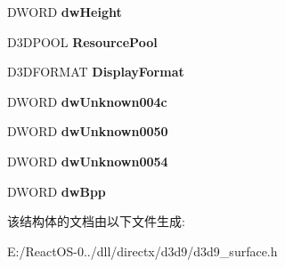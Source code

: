 \begin{DoxyCompactItemize}
\item 
\mbox{\label{struct___d3_d9_base_surface_a5f5f22c847022ad0ac8b59956f4b7405}} 
D\+W\+O\+RD {\bfseries dw\+Height}
\item 
\mbox{\label{struct___d3_d9_base_surface_a352fc832887945cb44c8cee2b141c6ea}} 
D3\+D\+P\+O\+OL {\bfseries Resource\+Pool}
\item 
\mbox{\label{struct___d3_d9_base_surface_a69b0a58f57ff9f5d595eb4be615f56b7}} 
D3\+D\+F\+O\+R\+M\+AT {\bfseries Display\+Format}
\item 
\mbox{\label{struct___d3_d9_base_surface_aac3965df17ef359a95c1999fc7654437}} 
D\+W\+O\+RD {\bfseries dw\+Unknown004c}
\item 
\mbox{\label{struct___d3_d9_base_surface_a3d51763681fd9b5b1795abe08d8af808}} 
D\+W\+O\+RD {\bfseries dw\+Unknown0050}
\item 
\mbox{\label{struct___d3_d9_base_surface_a95c525322676fc3f681fd858c0f1e81c}} 
D\+W\+O\+RD {\bfseries dw\+Unknown0054}
\item 
\mbox{\label{struct___d3_d9_base_surface_a8cb0b05a5a0a40bb0e23463fd6365d3d}} 
D\+W\+O\+RD {\bfseries dw\+Bpp}
\end{DoxyCompactItemize}


该结构体的文档由以下文件生成\+:\begin{DoxyCompactItemize}
\item 
E\+:/\+React\+O\+S-\/0../dll/directx/d3d9/d3d9\+\_\+surface.\+h\end{DoxyCompactItemize}
